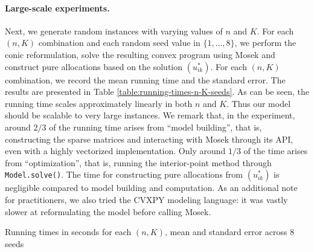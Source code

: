 \paragraph{Large-scale experiments.} 
Next, we generate random instances with varying values of $n$ and $K$.
For each $(n,K)$ combination and each random seed value in $\{ 1, \dots, 8\}$, we perform the conic reformulation, solve the resulting convex program using Mosek and construct pure allocations based on the solution $(u^*_{ik})$.
For each $(n,K)$ combination, we record the mean running time and the standard error.
The results are presented in Table \ref{table:running-times-n-K-seeds}. 
As can be seen, the running time scales approximately linearly in both $n$ and $K$. Thus our model should be scalable to very large instances.
We remark that, in the experiment, around $2/3$ of the running time arises from ``model building'', that is, constructing the sparse matrices and interacting with Mosek through its API, even with a highly vectorized implementation.
Only around $1/3$ of the time arises from ``optimization'', that is, running the interior-point method through \texttt{Model.solve()}. 
The time for constructing pure allocations from $(u^*_{ik})$ is negligible compared to model building and computation. As an additional note for practitioners, we also tried the CVXPY modeling language: it was vastly slower at reformulating the model before calling Mosek.

\begin{table}
	\begin{center}
		
		\caption{Running times in seconds for each $(n,K)$, mean and standard error across $8$ seeds} 
		\label{table:running-times-n-K-seeds}
	\end{center}
\end{table}